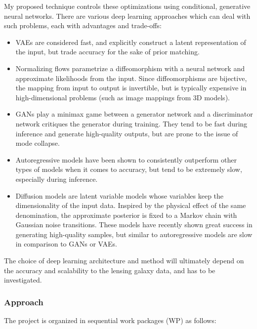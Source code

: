 \documentclass[a4paper,10pt]{article}
\begin{document}
My proposed technique controls these optimizations using conditional,
generative neural networks. There are various deep learning approaches
which can deal with such problems, each with advantages and
trade-offs:
\begin{itemize}
\item VAEs \citep{Kingma13} are considered fast, and explicitly
construct a latent representation of the input, but trade accuracy
for the sake of prior matching.
\item Normalizing flows \citep{Rezende15} parametrize a diffeomorphism
with a neural network and approximate likelihoods from the
input. Since diffeomorphisms are bijective, the mapping from input
to output is invertible, but is typically expensive in
high-dimensional problems (such as image mappings from 3D models).
\item GANs \citep{Goodfellow14} play a minimax game between a generator
network and a discriminator network critiques the generator during
training. They tend to be fast during inference and generate
high-quality outputs, but are prone to the issue of mode collapse.
\item Autoregressive models \citep{Parmar18} have been shown to consistently outperform
other types of models when it comes to accuracy, but tend to be
extremely slow, especially during inference.
\item Diffusion models \citep{Sohl-Dickstein15,Ho20} are latent
variable models whose variables keep the dimensionality of the input
data. Inspired by the physical effect of the same denomination, the
approximate posterior is fixed to a Markov chain with Gaussian noise
transitions. These models have recently shown great success in
generating high-quality samples, but similar to autoregressive
models are slow in comparison to GANs or VAEs.
\end{itemize}

The choice of deep learning architecture and method will ultimately
depend on the accuracy and scalability to the lensing galaxy data, and
has to be investigated.

\subsubsection{Approach}
\label{sec:org7a12cf9}

The project is organized in sequential work packages (WP) as follows:
\end{document}
